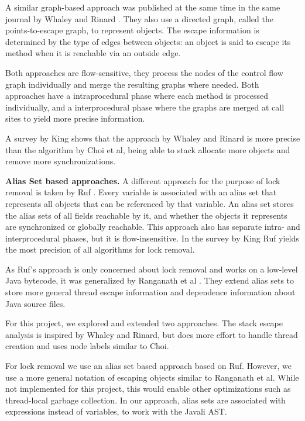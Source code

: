 \documentclass[letterpaper]{article}
\newcommand{\mypar}[1]{{\bf #1.}}
\begin{document}
A similar graph-based approach was published at the same time in the same journal
by Whaley and Rinard \cite{Whaley:99}. They also use a directed graph, called the points-to-escape graph,
to represent objects. The escape information is determined by the type of edges
between objects: an object is said to escape its method when it is reachable via an outside edge.

Both approaches are flow-sensitive, they process the nodes of the control flow graph
individually and merge the resulting graphs where needed. Both approaches have a
intraprocedural phase where each method is processed individually, and a interprocedural
phase where the graphs are merged at call sites to yield more precise information.

A survey by King \cite{King:04} shows that the approach by Whaley and Rinard is more precise
than the algorithm by Choi et al, being able to stack allocate more objects and
remove more synchronizations.

\mypar{Alias Set based approaches}
A different approach for the purpose of lock removal is taken by Ruf \cite{Ruf:00}.
Every variable is associated with an alias set that represents all objects that
can be referenced by that variable. An alias set stores the alias sets of all
fields reachable by it, and whether the objects it represents are synchronized
or globally reachable. This approach also has separate intra- and interprocedural
phases, but it is flow-insensitive. In the survey by  King \cite{King:04} Ruf
yields the most precision of all algorithms for lock removal.

As Ruf's approach is only concerned about lock removal and works on a low-level
Java bytecode, it was generalized by Ranganath et al \cite{Ranganath:04}.
They extend alias sets to store more general thread escape information
and dependence information about Java source files.

For this project, we explored and extended two approaches. The stack escape analysis
is inspired by Whaley and Rinard, but does more effort to handle thread creation
and uses node labels similar to Choi.

For lock removal we use an alias set based approach based on Ruf. However, we
use a more general notation of escaping objects similar to Ranganath et al. While
not implemented for this project, this would enable other optimizations such
as thread-local garbage collection. In our approach, alias sets are associated
with expressions instead of variables, to work with the Javali AST.
\end{document}
